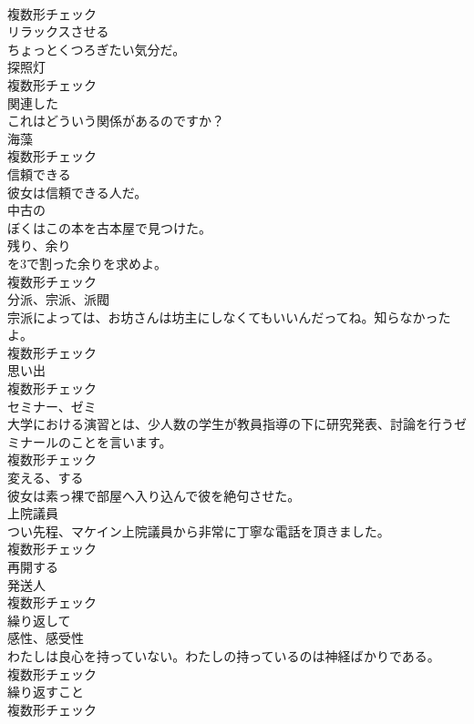 \documentclass[8pt]{extreport}
\begin{document}
\begin{CJK}{UTF8}{min}
\\	複数形チェック
\\	[形容詞]	リラックスさせる	
\\	ちょっとくつろぎたい気分だ。	
\\	[名詞]	探照灯	
\\	複数形チェック
\\	[形容詞]	関連した	
\\	これはどういう関係があるのですか？	
\\	[名詞]	海藻	
\\	複数形チェック
\\	[形容詞]	信頼できる	
\\	彼女は信頼できる人だ。	
\\	[形容詞]	中古の	
\\	ぼくはこの本を古本屋で見つけた。	
\\	[名詞]	残り、余り	
\\	を3で割った余りを求めよ。	
\\	複数形チェック
\\	[名詞]	分派、宗派、派閥	
\\	宗派によっては、お坊さんは坊主にしなくてもいいんだってね。知らなかったよ。	
\\	複数形チェック
\\	[名詞]	思い出	
\\	複数形チェック
\\	[名詞]	セミナー、ゼミ	
\\	大学における演習とは、少人数の学生が教員指導の下に研究発表、討論を行うゼミナールのことを言います。	
\\	複数形チェック
\\	[動詞]	変える、する	
\\	彼女は素っ裸で部屋へ入り込んで彼を絶句させた。	
\\	[名詞]	上院議員	
\\	つい先程、マケイン上院議員から非常に丁寧な電話を頂きました。	
\\	複数形チェック
\\	[動詞]	再開する	
\\	[名詞]	発送人	
\\	複数形チェック
\\	[副詞]	繰り返して	
\\	[名詞]	感性、感受性	
\\	わたしは良心を持っていない。わたしの持っているのは神経ばかりである。	
\\	複数形チェック
\\	[名詞]	繰り返すこと	
\\	複数形チェック

\end{CJK}
\end{document}
